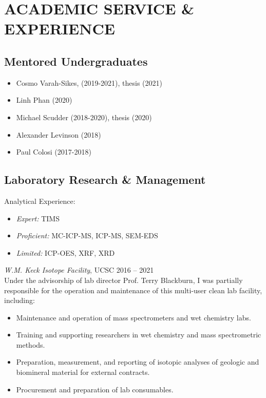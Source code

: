\documentclass[10pt]{article}
\begin{document}

\section*{ACADEMIC SERVICE \& EXPERIENCE}

\subsection*{\textbf{Mentored Undergraduates}}
\begin{itemize}
		\item Cosmo Varah-Sikes, (2019-2021), thesis (2021)
		\item Linh Phan (2020)
		\item Michael Scudder (2018-2020), thesis (2020)
		\item Alexander Levinson (2018)
		\item Paul Colosi (2017-2018)
\end{itemize}

\subsection*{\textbf{Laboratory Research \& Management}}
Analytical Experience:
	\begin{itemize} [label={}]
		\item \textit{Expert:} TIMS
		\item \textit{Proficient:} MC-ICP-MS, ICP-MS, SEM-EDS
		\item \textit{Limited:} ICP-OES, XRF, XRD
	\end{itemize} \vspace{2ex}
	
 \textit{W.M. Keck Isotope Facility}, UCSC \hfill 2016 -- 2021\\
Under the advisorship of lab director Prof. Terry Blackburn, I was partially responsible for the operation and maintenance of this multi-user clean lab facility, including:
	\begin{itemize} 
	\item Maintenance and operation of mass spectrometers and wet chemistry labs.
	\item Training and supporting researchers in wet chemistry and mass spectrometric methods.
	\item Preparation, measurement, and reporting of isotopic analyses of geologic and biomineral material for external contracts.
	\item Procurement and preparation of lab consumables.
	\end{itemize}
	
\end{document}

